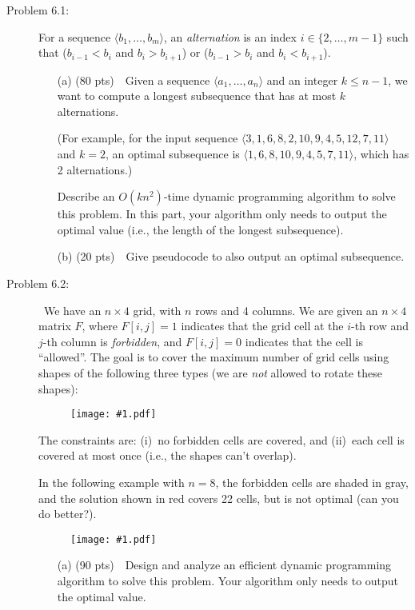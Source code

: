 \documentclass[11pt]{article}
\newcommand{\fig}[2]{\begin{figure}[h]\begin{center}%
  \texttt{[image: \#1.pdf]}\end{center}%
  \end{figure}}
\begin{document}
\begin{description}
\bigskip
\item[Problem 6.1:] 
For a sequence $\langle b_1,\ldots,b_m\rangle$, an \emph{alternation} is an index $i\in\{2,\ldots,m-1\}$
such that ($b_{i-1}<b_i$ and $b_i>b_{i+1}$) or ($b_{i-1}>b_i$ and $b_i<b_{i+1}$).

\begin{enumerate}
\item[(a)] (80 pts)\ \ 
Given a sequence $\langle a_1,\ldots,a_n\rangle$ and an integer $k\le n-1$, we want
to compute a longest subsequence that has at most $k$ alternations.

(For example, for the input sequence $\langle 3,1,6,8,2,10,9,4,5,12,7,11\rangle$ and $k=2$,
an optimal subsequence is $\langle 1,6,8,10,9,4,5,7,11\rangle$, which has 2 alternations.)


Describe an $O(kn^2)$-time dynamic programming algorithm to solve this problem.
In this part, your algorithm only needs to output the optimal value (i.e., the length of the longest subsequence).
\item[(b)] (20 pts)\ \ 
Give pseudocode to also output an optimal subsequence.
\end{enumerate}


\bigskip
\item[Problem 6.2:] \
We have an $n\times 4$ grid, with $n$ rows and 4 columns.
We are given an $n\times 4$ matrix $F$, where $F[i,j]=1$ indicates that the grid cell
at the $i$-th row and $j$-th column is \emph{forbidden}, and $F[i,j]=0$ indicates that the cell is
``allowed''.
The goal is to cover the maximum number of grid cells using shapes of the following three types
(we are \emph{not} allowed to rotate these shapes):

\fig{hw6fig}{0.5,page=1}

The constraints are: (i)~no forbidden cells are covered, and (ii)~each cell
is covered at most once (i.e., the shapes can't overlap).

\newpage
In the following example with $n=8$, the forbidden cells are shaded in gray, and
the solution shown in red covers 22 cells, but is not optimal (can you do better?).

\fig{hw6fig}{0.5,page=2}

\vspace{-2ex}
\begin{enumerate}
\item[(a)] (90 pts)\ \
Design and analyze an efficient dynamic programming algorithm to solve this problem.
Your algorithm only needs to output the optimal value.


\end{enumerate}
\end{description}
\end{document}
